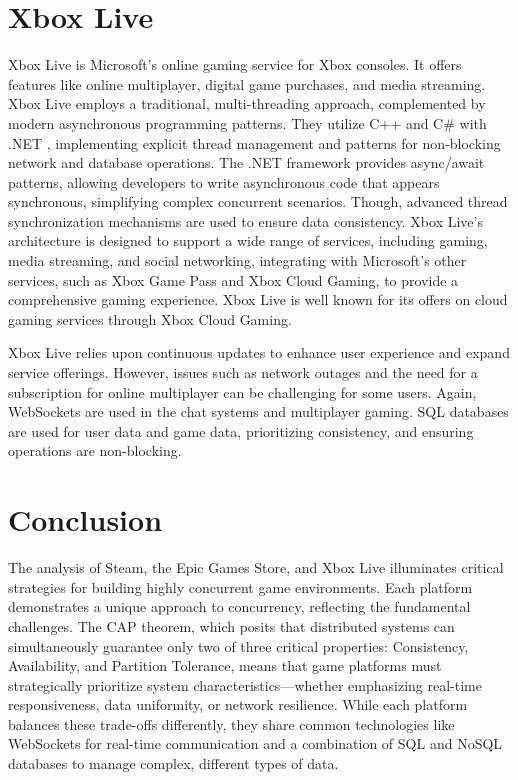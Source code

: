 \documentclass[]{final}
\begin{document}
\section{Xbox Live}
Xbox Live is Microsoft's online gaming service for Xbox consoles. It offers
features like online multiplayer, digital game purchases, and media streaming.
Xbox Live employs a traditional, multi-threading approach, complemented by modern
asynchronous programming patterns. They utilize C++ and C\# with .NET \cite{kevinasgari_microsoft.xbox.services_nodate}, implementing
explicit thread management and patterns for non-blocking network and database operations.
The .NET framework provides async/await patterns, allowing developers to write
asynchronous code that appears synchronous, simplifying complex concurrent scenarios.
Though, advanced thread synchronization mechanisms are used to ensure data consistency.
\cite{m-stahl_sdk_2023, woolsey_how_2024} Xbox Live's architecture is designed to support a wide range of services, including gaming,
media streaming, and social networking, integrating with Microsoft's other services, such as Xbox Game
Pass and Xbox Cloud Gaming, to provide a comprehensive gaming experience. Xbox Live is well known
for its offers on cloud gaming services through Xbox Cloud Gaming.

Xbox Live relies upon continuous updates to enhance user experience and
expand service offerings. However, issues such as network outages and the need
for a subscription for online multiplayer can be challenging for some users.
Again, WebSockets are used in the chat systems and multiplayer gaming.
SQL databases are used for user data and game data,\cite{woolsey_how_2024}
prioritizing consistency, and ensuring operations are non-blocking.


\section{Conclusion}

The analysis of Steam, the Epic Games Store, and Xbox Live illuminates
critical strategies for building highly concurrent game environments. Each platform
demonstrates a unique approach to concurrency, reflecting the fundamental challenges.
The CAP theorem, which posits that distributed systems can
simultaneously guarantee only two of three critical properties: Consistency,
Availability, and Partition Tolerance, means that game platforms must
strategically prioritize system characteristics—whether emphasizing real-time
responsiveness, data uniformity, or network resilience.
\cite{gilbert_perspectives_2012} While each platform balances these
trade-offs differently, they share common technologies like WebSockets for real-time
communication and a combination of SQL and NoSQL databases to manage complex,
different types of data.
\end{document}
